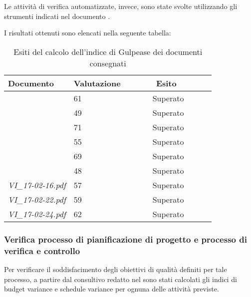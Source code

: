 		Le attività di verifica automatizzate, invece, sono state svolte utilizzando gli strumenti indicati nel documento \NdP. 
		
		I risultati ottenuti sono elencati nella seguente tabella:
		\begin{table}[H]
		\begin{tabular}{|l|l|l|}
		\hline
		\textbf{Documento} 		&\textbf{Valutazione} &\textbf{~~~~~~Esito~~~~~~} \\
		\hline
		\PdQ 					&61		&~~~~~~Superato~~~~~~\\
		\NdP 					&49		&~~~~~~Superato~~~~~~\\
		\AdR 					&71		&~~~~~~Superato~~~~~~\\
		\PdP 					&55		&~~~~~~Superato~~~~~~\\
		\ST 					&69		&~~~~~~Superato~~~~~~\\	
		\Glossario 				&48		&~~~~~~Superato~~~~~~\\
		\textit{VI_17-02-16.pdf} 		&57		&~~~~~~Superato~~~~~~\\
		\textit{VI_17-02-22.pdf} 		&59		&~~~~~~Superato~~~~~~\\
		\textit{VI_17-02-24.pdf} 		&62		&~~~~~~Superato~~~~~~\\
		\hline
		\end{tabular}
		\caption{Esiti del calcolo dell'indice di Gulpease dei documenti consegnati}
		\end{table}
		
		\subsubsection{Verifica processo di pianificazione di progetto e processo di verifica e controllo}
		Per verificare il soddisfacimento degli obiettivi di qualità definiti per tale processo, a partire dal consultivo redatto nel \PdP{} sono stati calcolati gli indici di budget variance e schedule variance per ognuna delle attività previste.
		
